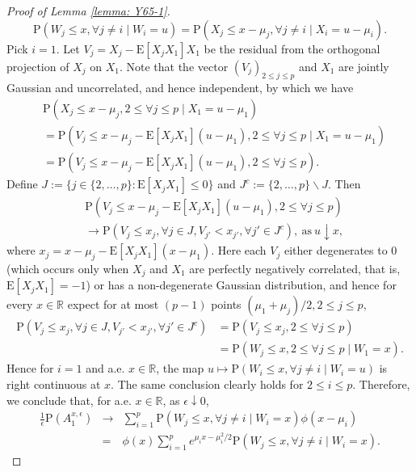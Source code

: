 \documentclass[11pt,reqno]{amsart}
\theoremstyle{definition}
\newcommand{\Ep}{{\mathrm{E}}}
\renewcommand{\Pr}{{\mathrm{P}}}
\newcommand{\RR}{\mathbb{R}}
\begin{document}
\begin{proof}[Proof of Lemma \ref{lemma: Y65-1}]
\begin{equation*}
\Pr(W_{j} \leq x, \forall j \neq i \mid W_{i} = u)=\Pr(X_{j} \leq x-\mu_{j}, \forall j \neq i \mid X_{i} = u-\mu_{i}).
\end{equation*}
Pick $i=1$. Let $V_{j} = X_{j} - \Ep[ X_{j} X_{1}] X_{1}$ be the residual from the orthogonal projection of $X_{j}$ on $X_{1}$.
Note that the vector $(V_{j})_{2 \leq j \leq p}$ and $X_{1}$ are jointly Gaussian and uncorrelated, and hence independent, by which we have
\begin{align*}
&\Pr(X_{j} \leq x-\mu_{j}, 2 \leq \forall j \leq p \mid X_{1} = u-\mu_{1}) \\
&= \Pr(V_{j} \leq x-\mu_{j}-\Ep[ X_{j} X_{1}] (u-\mu_{1}), 2 \leq \forall j \leq p \mid X_{1} = u-\mu_{1}) \\
&=  \Pr(V_{j} \leq x-\mu_{j}-\Ep[ X_{j} X_{1}] (u-\mu_{1}), 2 \leq \forall j \leq p).
\end{align*}
Define $J := \{ j \in \{ 2,\dots,p \} : \Ep[ X_{j} X_{1}] \leq 0 \}$ and $J^{c} := \{ 2,\dots, p\} \backslash J$. Then
\begin{align*}
&\Pr(V_{j} \leq x-\mu_{j}-\Ep[ X_{j} X_{1}] (u-\mu_{1}), 2 \leq \forall j \leq p) \\
&\to \Pr( V_{j} \leq x_j, \forall j \in J, V_{j'} < x_{j'}, \forall j' \in J^{c}), \ \text{as} \ u \downarrow x,
\end{align*}
where $x_j=x-\mu_{j}-\Ep[X_{j}X_1](x-\mu_{1})$.
Here each $V_{j}$ either degenerates to $0$ (which occurs only when $X_{j}$ and $X_{1}$ are perfectly negatively correlated, that is, $\Ep [ X_{j} X_{1} ] = -1$) or has a non-degenerate Gaussian distribution, and hence for every $x \in \RR$ expect for at most $(p-1)$ points $(\mu_{1}+\mu_{j})/2, 2 \leq j \leq p$,
\begin{align*}
\Pr( V_{j} \leq x_j, \forall j \in J, V_{j'} < x_{j'}, \forall j' \in J^{c}) &=  \Pr( V_{j} \leq x_{j}, 2 \leq \forall j \leq p ) \\
&= \Pr(W_{j} \leq x, 2 \leq \forall j \leq p \mid W_{1} = x).
\end{align*}
Hence for $i=1$ and a.e. $x \in \RR$, the map $u \mapsto \Pr(W_{i} \leq x, \forall j \neq i \mid W_{i} = u)$ is right continuous at $x$. The same conclusion clearly holds for $2 \leq i \leq p$.
Therefore, we conclude that, for a.e. $x \in \RR$, as $\epsilon \downarrow 0$,
\begin{eqnarray*}
\frac{1}{\epsilon} \Pr(A_{1}^{x,\epsilon}) &\to& \sum_{i=1}^{p} \Pr(W_{j} \leq x, \forall j \neq i \mid W_{i} = x)\phi(x-\mu_{i})\\
&=&\phi(x)\sum_{i=1}^{p} e^{\mu_{i}x-\mu_{i}^2/2} \Pr(W_{j} \leq x, \forall j \neq i \mid W_{i} = x).
\end{eqnarray*}




\end{proof}
\end{document}
